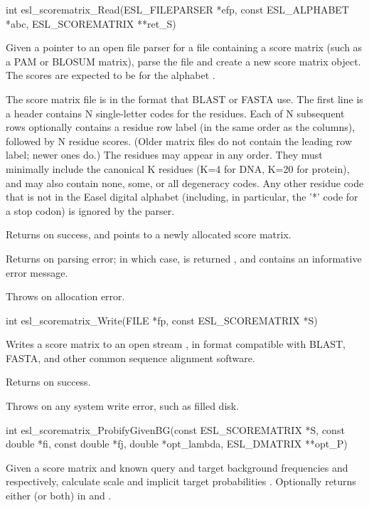 \begin{sreapi}
\hypertarget{func:esl_scorematrix_Read()}
{\item[int esl\_scorematrix\_Read(ESL\_FILEPARSER *efp, const ESL\_ALPHABET *abc, ESL\_SCOREMATRIX **ret\_S)]}

Given a pointer  to an open file parser for a file
containing a score matrix (such as a PAM or BLOSUM
matrix), parse the file and create a new score matrix
object. The scores are expected to be for the alphabet
. 

The score matrix file is in the format that BLAST or
FASTA use. The first line is a header contains N
single-letter codes for the residues. Each of N
subsequent rows optionally contains a residue row label
(in the same order as the columns), followed by N
residue scores.  (Older matrix files do not contain the
leading row label; newer ones do.) The residues may
appear in any order. They must minimally include the
canonical K residues (K=4 for DNA, K=20 for protein),
and may also contain none, some, or all degeneracy
codes. Any other residue code that is not in the Easel
digital alphabet (including, in particular, the '*' code
for a stop codon) is ignored by the parser.

Returns  on success, and  points to a newly allocated 
score matrix. 

Returns  on parsing error; in which case,  is
returned , and  contains an informative
error message.

Throws  on allocation error.


\hypertarget{func:esl_scorematrix_Write()}
{\item[int esl\_scorematrix\_Write(FILE *fp, const ESL\_SCOREMATRIX *S)]}

Writes a score matrix  to an open stream , in 
format compatible with BLAST, FASTA, and other common
sequence alignment software.

Returns  on success.

Throws  on any system write error, such as filled disk.


\hypertarget{func:esl_scorematrix_ProbifyGivenBG()}
{\item[int esl\_scorematrix\_ProbifyGivenBG(const ESL\_SCOREMATRIX *S, const double *fi, const double *fj, 
			       double *opt\_lambda, ESL\_DMATRIX **opt\_P)]}

Given a score matrix  and known query and target
background frequencies  and  respectively, calculate scale
 and implicit target probabilities \citep{Altschul01}. 
Optionally returns either (or both) in  and .


\end{sreapi}

